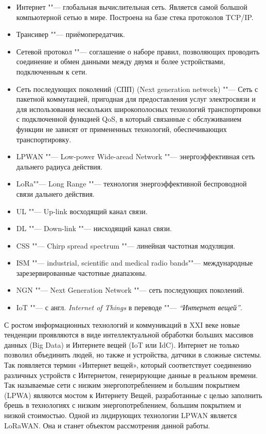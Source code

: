 \Defines

\begin{itemize}
 \item[] Интернет ""--- глобальная вычислительная сеть. Является самой 
большой компьютерной сетью в мире. Построена на базе стека протоколов TCP/IP.
 \item[] Трансивер ""--- приёмопередатчик.
 \item[] Сетевой протокол ""--- соглашение о наборе правил, позволяющих 
проводить соединение и обмен данными между двумя и более устройствами, 
подключенным к сети.
 \item[] Сеть последующих поколений (СПП) (Next generation network) ""--- Сеть 
с пакетной коммутацией, пригодная для предоставления услуг электросвязи и для 
использования нескольких широкополосных технологий транспортировки с 
подключенной функцией QoS, в который связанные с обслуживанием функции не 
зависят от примененных технологий, обеспечивающих транспортировку.
\end{itemize}

\Abbreviations
\begin{itemize}
  \item[] LPWAN ""--- Low-power Wide-aread Network ""--- энергоэффективная сеть 
дальнего радиуса действия.
  \item[] LoRa\texttrademark ""--- Long Range ""--- технология энергоэффективной 
беспроводной 
связи дальнего действия.
  \item[] UL ""--- Up-link восходящий канал связи.
  \item[] DL ""--- Down-link ""--- нисходящий канал связи.
  \item[] CSS ""--- Chirp spread spectrum ""--- линейная частотная модуляция.
  \item[] ISM ""--- industrial, scientific and medical radio bands""--- 
международные зарезервированные частотные диапазоны.
  \item[] NGN ""--- Next Generation Network ""--- сеть последующих поколений.
  \item[] IoT ""--- с англ. \textit{Internet of Things} в переводе ""--- 
\textit{``Интернет вещей''}.
\end{itemize}

\Introduction
С ростом информационных технологий и коммуникаций в XXI веке новые тенденции 
проявляются в виде интеллектуальной обработки больших массивов данных (Big Data) 
и Интернете вещей (IoT или IdC). 
Интернет не только позволил объединить людей, но также и устройства, датчики в 
сложные системы. 
Так появляется термин «Интернет вещей», который соответствует соединению 
различных устройств с Интернетом, генерирующие данные в реальном времени. 
Так называемые сети с низким энергопотреблением и большим покрытием (LPWA) 
являются мостом к Интернету Вещей, разработанные с целью заполнить брешь в 
технологиях с низким энергопотреблением, большим покрытием и низкой стоимостью. 
Одной из лидирующих технологии LPWAN является LoRaWAN\texttrademark. Она и 
станет объектом рассмотрения данной работы.

